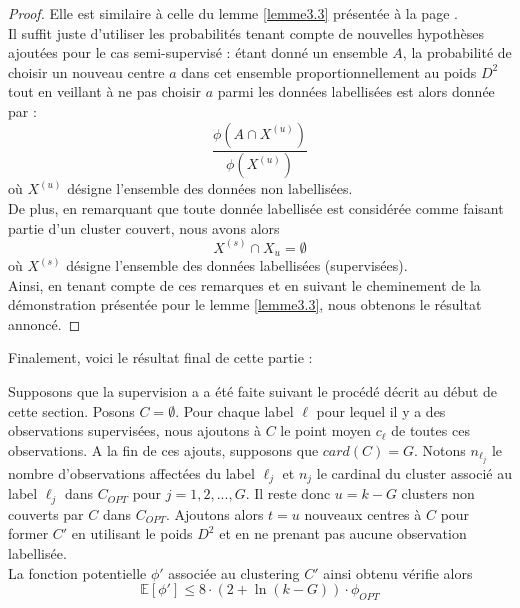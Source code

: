 \documentclass[12pt,a4paper]{book}
\newcommand{\E}{\mathbb{E}}
\newcommand{\1}{\mathds{1}}
\begin{document}
	\begin{proof}
		Elle est similaire à celle du lemme \ref{lemme3.3} présentée à la page \pageref{lemme3.3}.\\
		Il suffit juste d'utiliser les probabilités tenant compte de nouvelles hypothèses ajoutées pour le cas semi-supervisé : étant donné un ensemble $A$, la probabilité de choisir un nouveau centre $a$ dans cet ensemble proportionnellement au poids $D^2$ tout en veillant à ne pas choisir $a$ parmi les données labellisées est alors donnée par :
		$$
			\frac{\phi \left( A \cap X^{(u)} \right)}{\phi \left(X^{(u)}\right)}
		$$ 
		où $X^{(u)}$ désigne l'ensemble des données non labellisées.\\
		
		De plus, en remarquant que toute donnée labellisée est considérée comme faisant partie d'un cluster couvert,  nous avons alors
		$$
			X^{(s)} \cap X_u = \emptyset
		$$
		où $X^{(s)}$ désigne l'ensemble des données labellisées (supervisées).\\
		
		Ainsi, en tenant compte de ces remarques et en suivant le cheminement de la démonstration présentée pour le lemme \ref{lemme3.3}, nous obtenons le résultat annoncé.
	\end{proof}	
	
	Finalement, voici le résultat final de cette partie :
	
	\begin{theorem}\label{theoreme4.7}
		Supposons que la supervision a a été faite suivant le procédé décrit au début de cette section. Posons $C = \emptyset$. Pour chaque label $\ell$ pour lequel il y a des observations supervisées, nous ajoutons à $C$ le point moyen $c_\ell$ de toutes ces observations. A la fin de ces ajouts, supposons que $card(C)=G$. Notons $n_{\ell_j}$ le nombre d'observations affectées du label $\ell_j$ et $n_j$ le cardinal du cluster associé au label $\ell_j$ dans $C_{OPT}$  pour $j = 1, 2, ..., G$. Il reste donc $u=k-G$ clusters non couverts par $C$ dans $C_{OPT}$. Ajoutons alors $t=u$ nouveaux centres à $C$ pour former $C'$ en utilisant le poids $D^2$ et en ne prenant pas aucune observation labellisée.\\
		La fonction potentielle $\phi'$ associée au clustering $C'$ ainsi obtenu vérifie alors
		$$
			\E[\phi'] \leq 8 \cdot \left(2 + \ln (k - G) \right) \cdot \phi_{OPT}
		$$ 
	\end{theorem}
	
\end{document}
